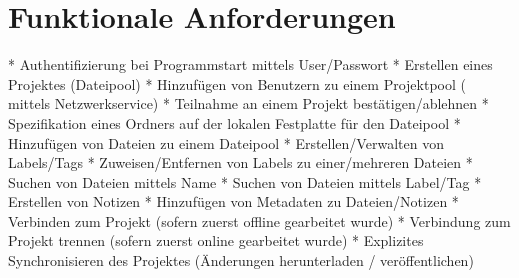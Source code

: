
\section{Funktionale Anforderungen}
* Authentifizierung bei Programmstart mittels User/Passwort
* Erstellen eines Projektes (Dateipool)
* Hinzuf\"ugen von Benutzern zu einem Projektpool ( mittels Netzwerkservice)
* Teilnahme an einem Projekt best\"atigen/ablehnen
* Spezifikation eines Ordners auf der lokalen Festplatte f\"ur den Dateipool
* Hinzuf\"ugen von Dateien zu einem Dateipool
* Erstellen/Verwalten von Labels/Tags
* Zuweisen/Entfernen von Labels zu einer/mehreren Dateien
* Suchen von Dateien mittels Name
* Suchen von Dateien mittels Label/Tag
* Erstellen von Notizen
* Hinzuf\"ugen von Metadaten zu Dateien/Notizen
* Verbinden zum Projekt (sofern zuerst offline gearbeitet wurde)
* Verbindung zum Projekt trennen (sofern zuerst online gearbeitet wurde)
* Explizites Synchronisieren des Projektes (\"Anderungen herunterladen / ver\"offentlichen)

